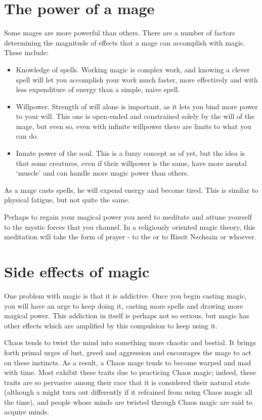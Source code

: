 \section{The power of a mage}
Some mages are more powerful than others. There are a number of factors determining the magnitude of effects that a mage can accomplish with magic. These include: 

\begin{itemize}
	\item Knowledge of spells. Working magic is complex work, and knowing a clever spell will let you accomplish your work much faster, more effectively and with less expenditure of energy than a simple, naive spell. 
	\item Willpower. Strength of will alone is important, as it lets you bind more power to your will. This one is open-ended and constrained solely by the will of the mage, but even so, even with infinite willpower there are limits to what you can do.
	\item Innate power of the soul. This is a fuzzy concept as of yet, but the idea is that some creatures, even if their willpower is the same, have more mental `muscle' and can handle more magic power than others. 
\end{itemize}

As a mage casts spells, he will expend energy and become tired. This is similar to physical fatigue, but not quite the same. 

Perhaps to regain your magical power you need to meditate and attune yourself to the mystic forces that you channel. In a religiously oriented magic theory, this meditation will take the form of prayer - to the \Sephiroth{} or to Rissit Nechsain or whoever. 



\section{Side effects of magic}
One problem with magic is that it is addictive. Once you begin casting magic, you will have an urge to keep doing it, casting more spells and drawing more magical power. This addiction in itself is perhaps not so serious, but magic has other effects which are amplified by this compulsion to keep using it. 

Chaos tends to twist the mind into something more chaotic and bestial. It brings forth primal urges of lust, greed and aggression and encourages the mage to act on these instincts. As a result, a Chaos mage tends to become warped and mad with time. Most \dragons{} exhibit these traits due to practicing Chaos magic; indeed, these traits are so pervasive among their race that it is considered their natural state (although a \dragon{} might turn out differently if it refrained from using Chaos magic all the time), and people whose minds are twisted through Chaos magic are said to acquire \draconic{} minds. 

